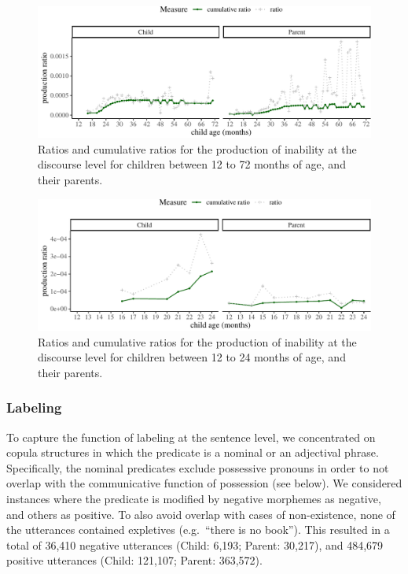 \documentclass[
  english,
  man,floatsintext]{apa6}
\begin{document}
\begin{figure}[H]

{\centering \includegraphics{neg_construction_article_files/figure-latex/inabilitydiscourse-1} 

}

\caption{Ratios and cumulative ratios for the production of inability at the discourse level for children between 12 to 72 months of age, and their parents.}\label{fig:inabilitydiscourse}
\end{figure}

\begin{figure}[H]

{\centering \includegraphics{neg_construction_article_files/figure-latex/inabilitydiscoursebegin-1} 

}

\caption{Ratios and cumulative ratios for the production of inability at the discourse level for children between 12 to 24 months of age, and their parents.}\label{fig:inabilitydiscoursebegin}
\end{figure}

\hypertarget{labeling}{%
\subsubsection{Labeling}\label{labeling}}

To capture the function of labeling at the sentence level, we concentrated on copula structures in which the predicate is a nominal or an adjectival phrase. Specifically, the nominal predicates exclude possessive pronouns in order to not overlap with the communicative function of possession (see below). We considered instances where the predicate is modified by negative morphemes as negative, and others as positive. To also avoid overlap with cases of non-existence, none of the utterances contained expletives (e.g.~``there is no book''). This resulted in a total of 36,410 negative utterances (Child: 6,193; Parent: 30,217), and 484,679 positive utterances (Child: 121,107; Parent: 363,572).
\end{document}

